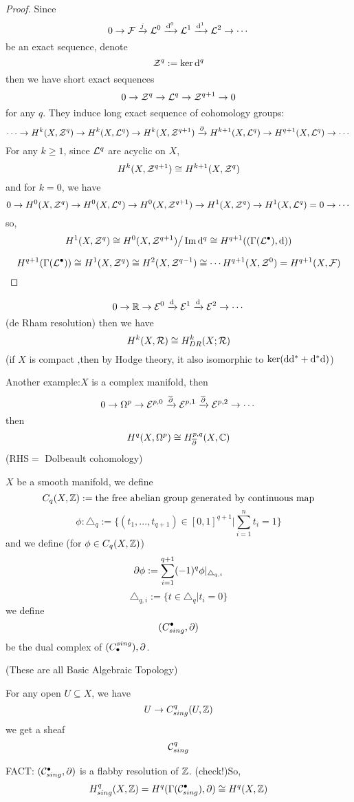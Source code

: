 \begin{proof}
Since
$$
0\to \mathcal{F}\xrightarrow{j}\mathcal{L}^0\xrightarrow{\mathrm{d}^0}\mathcal{L}^1\xrightarrow{\mathrm{d}^1}\mathcal{L}^2\to\cdots
$$
be an exact sequence, denote
$$\mathcal{Z}^q:=\ker \mathrm{d}^q$$
then we have short exact sequences
$$0\to \mathcal{Z}^q\to\mathcal{L}^q\to\mathcal{Z}^{q+1}\to 0$$
for any $q$. They induce long exact sequence of cohomology groups:
$$\cdots\to H^k(X,\mathcal{Z}^q)\to H^k(X,\mathcal{L}^q)\to H^k(X,\mathcal{Z}^{q+1})\xrightarrow{\partial}
H^{k+1}(X,\mathcal{L}^q)\to H^{q+1}(X,\mathcal{L}^q)\to\cdots$$
For any $k\geq 1$, since $\mathcal{L}^q$ are acyclic on $X$,
$$H^k(X,\mathcal{Z}^{q+1})\cong H^{k+1}(X,\mathcal{Z}^q)$$
and for $k=0$, we have
$$
0\to H^0(X,\mathcal{Z}^q)\to H^0(X,\mathcal{L}^q)\to H^0(X,\mathcal{Z}^{q+1})\to
H^1(X,\mathcal{Z}^q)\to H^1(X,\mathcal{L}^q)=0\to\cdots
$$
so,
$$H^1(X,\mathcal{Z}^q)\cong H^0(X,\mathcal{Z}^{q+1})\big/\operatorname{Im}\mathrm{d}^q
\cong H^{q+1}((\Gamma(\mathcal{L}^{\bullet}),\mathrm{d}))$$

$$H^{q+1}(\Gamma(\mathcal{L}^{\bullet}))\cong H^1(X,\mathcal{Z}^q)\cong H^2(X,\mathcal{Z}^{q-1})\cong\cdots
H^{q+1}(X,\mathcal{Z}^0)=H^{q+1}(X,\mathcal{F})$$
\end{proof}


$$0\to\mathbb{R}\to\mathcal{E}^0\xrightarrow{\mathrm{d}}\mathcal{E}^1\xrightarrow{\mathrm{d}}\mathcal{E}^2\to\cdots$$
(de Rham resolution) then we have
$$H^k(X,\mathcal{R})\cong H_{DR}^k(X;\mathcal{R})$$
(if $X$ is compact ,then by Hodge theory, it also isomorphic to $\ker(\mathrm{d}\mathrm{d}^*+\mathrm{d}^*\mathrm{d})$)

Another example:$X$ is a complex manifold, then
$$0\to\Omega^p\to\mathcal{E}^{p,0}\xrightarrow{\overline{\partial}}\mathcal{E}^{p,1}\xrightarrow{\overline{\partial}}\mathcal{E}^{p,2}\to\cdots$$
then
$$H^{q}(X,\Omega^p)\cong H_{\overline{\partial}}^{p,q}(X,\mathbb{C})$$
(RHS$=$ Dolbeault cohomology)


$X$ be a smooth manifold, we define
$$C_q(X,\mathbb{Z}):=\text{the free abelian group generated by continuous map}$$
$$\phi:\triangle_q:=\{(t_1,...,t_{q+1})\in[0,1]^{q+1}|\sum_{i=1}^nt_i=1\}$$
and we define (for $\phi\in C_q(X,\mathbb{Z})$)
$$\partial\phi:=\sum_{i=1}^{q+1}(-1)^q\phi|_{\triangle_{q,i}}$$
$$\triangle_{q,i}:=\{t\in\triangle_q|t_i=0\}$$
we define
$$(C_{sing}^{\bullet},\partial)$$
be the dual complex of $(C^{sing}_{\bullet}),\partial$.

(These are all Basic Algebraic Topology)

For any open $U\subseteq X$, we have
$$U\to C_{sing}^q(U,\mathbb{Z})$$
we get a sheaf
$$\mathcal{C}_{sing}^q$$

FACT: $(\mathcal{C}_{sing}^{\bullet},\partial)$ is a flabby resolution of $\mathbb{Z}$. (check!)So,
$$H^q_{sing}(X,\mathbb{Z})= H^q(\Gamma(\mathcal{C}_{sing}^{\bullet}),\partial)
\cong H^q(X,\mathbb{Z})$$



